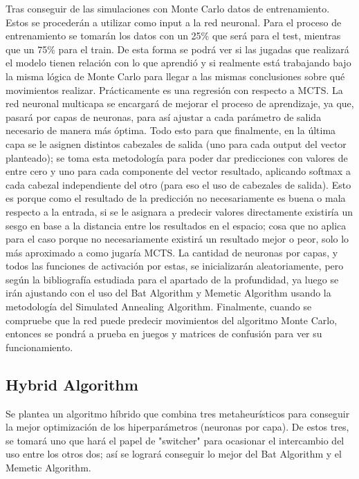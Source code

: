 Tras conseguir de las simulaciones con Monte Carlo datos de entrenamiento. Estos se procederán a utilizar como input a la red neuronal.\newline
Para el proceso de entrenamiento se tomarán los datos con un 25\% que será para el test, mientras que un 75\% para el train. De esta forma se podrá ver si las jugadas que realizará el modelo tienen relación con lo que aprendió y si realmente está trabajando bajo la misma lógica de Monte Carlo para llegar a las mismas conclusiones sobre qué movimientos realizar. Prácticamente es una regresión con respecto a MCTS.\newline
La red neuronal multicapa se encargará de mejorar el proceso de aprendizaje, ya que, pasará por capas de neuronas, para así ajustar a cada parámetro de salida necesario de manera más óptima. Todo esto para que finalmente, en la última capa se le asignen distintos cabezales de salida (uno para cada output del vector planteado); se toma esta metodología para poder dar predicciones con valores de entre cero y uno para cada componente del vector resultado, aplicando softmax a cada cabezal independiente del otro (para eso el uso de cabezales de salida). Esto es porque como el resultado de la predicción no necesariamente es buena o mala respecto a la entrada, si se le asignara a predecir valores directamente existiría un sesgo en base a la distancia entre los resultados en el espacio; cosa que no aplica para el caso porque no necesariamente existirá un resultado mejor o peor, solo lo más aproximado a como jugaría MCTS.\newline
La cantidad de neuronas por capas, y todos las funciones de activación por estas, se inicializarán aleatoriamente, pero según la bibliografía estudiada para el apartado de la profundidad, ya luego se irán ajustando con el uso del Bat Algorithm y Memetic Algorithm usando la metodología del Simulated Annealing Algorithm.\newline
Finalmente, cuando se compruebe que la red puede predecir movimientos del algoritmo Monte Carlo, entonces se pondrá a prueba en juegos y matrices de confusión para ver su funcionamiento.

\subsection{Hybrid Algorithm}
Se plantea un algoritmo híbrido que combina tres metaheurísticos para conseguir la mejor optimización de los hiperparámetros (neuronas por capa). De estos tres, se tomará uno que hará el papel de "switcher" para ocasionar el intercambio del uso entre los otros dos; así se logrará conseguir lo mejor del Bat Algorithm y el Memetic Algorithm.
